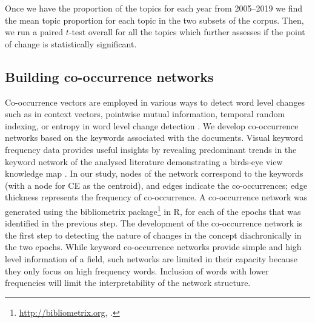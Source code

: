 \documentclass[output=paper]{langsci/langscibook}
\begin{document}
Once we have the proportion of the topics for each year from 2005--2019 we find the mean topic proportion for each topic in the two subsets of the corpus. Then, we run a paired $t$-test overall for all the topics which further assesses if the point of change is statistically significant. 

\subsection{Building co-occurrence networks}
\begin{sloppypar}
Co-occurrence vectors are employed in various ways to detect word level changes such as in context vectors, pointwise mutual information, temporal random indexing, or entropy in word level change detection \citep{tahmasebi2018survey}. We develop co-occurrence networks based on the keywords associated with the documents. Visual keyword frequency data provides useful insights by revealing predominant trends in the keyword network of the analysed literature demonstrating a birds-eye view knowledge map \citep{li2019trends}.
In our study, nodes of the network correspond to the keywords (with a node for CE as the centroid), and edges indicate the co-occurrences; edge thickness represents the frequency of co-occurrence. A co-occurrence network was generated using the bibliometrix package\footnote{\url{http://bibliometrix.org}, \citet{aria2017bibliometrix}.} in R, for each of the epochs that was identified in the previous step. The development of the co-occurrence network is the first step to detecting the nature of changes in the concept diachronically in the two epochs. 
While keyword co-occurrence networks provide simple and high level information of a field, such networks are limited in their capacity because they only focus on high frequency words. Inclusion of words with lower frequencies will limit the interpretability of the network structure.
\end{sloppypar}
\end{document}
